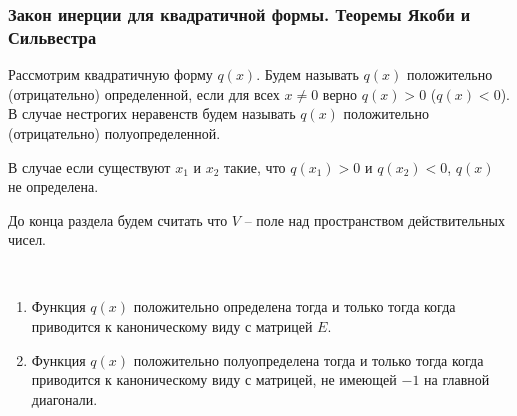\subsubsection{Закон инерции для квадратичной формы. Теоремы Якоби и Сильвестра}

\begin{definition} 
    Рассмотрим квадратичную форму $q(x)$. Будем называть $q(x)$ положительно (отрицательно) 
    определенной, если для всех $x \neq 0$ верно $q(x) > 0$ ($q(x) < 0$). В случае нестрогих неравенств 
    будем называть $q(x)$ положительно (отрицательно) полуопределенной.
\end{definition}

\begin{note}
    В случае если существуют $x_1$ и $x_2$ такие, что $q(x_1) > 0$ и $q(x_2) < 0$, $q(x)$ не определена.
\end{note}

\begin{agreement}
    До конца раздела будем считать что $V$ -- поле над пространством действительных чисел.
\end{agreement}

\begin{proposition}~
    \label{pr10.1}
    \begin{enumerate}
        \item Функция $q(x)$ положительно определена тогда и только тогда когда приводится к каноническому
        виду с матрицей $E$.
        \item Функция $q(x)$ положительно полуопределена тогда и только тогда когда приводится к 
        каноническому виду с матрицей, не имеющей $-1$ на главной диагонали.
    \end{enumerate}
\end{proposition}

